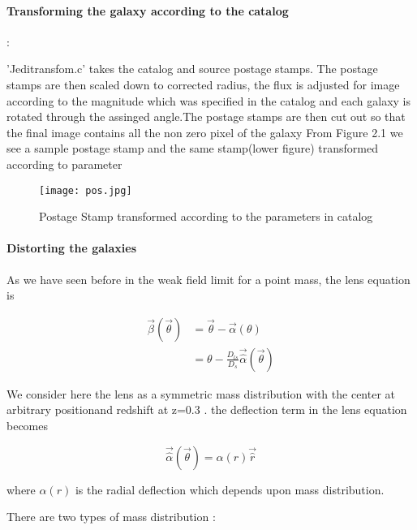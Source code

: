 \paragraph{Transforming the galaxy according to the catalog}:

'Jeditransfom.c' takes the catalog and source postage stamps. The postage stamps are then scaled down to corrected radius, the flux is adjusted for image according to
the magnitude which was specified in the catalog and each galaxy is rotated through the assinged angle.The postage stamps are then cut out so that
the final image contains all the non zero pixel of the galaxy
From Figure 2.1 we see a sample postage stamp and the same stamp(lower figure) transformed according to parameter

\begin{figure}[ht]
\begin{center}
\texttt{[image: pos.jpg]}
\label{fig}
\caption{Postage Stamp transformed according to the parameters in catalog}
\end{center}
\end{figure}

\clearpage

\paragraph{Distorting the galaxies}

As we have seen before in the weak field limit for a point mass, the lens equation is

\begin{equation}
\begin{split}
 \vec\beta(\vec\theta) &= \vec\theta - \vec\alpha(\theta) \\
                       &= \theta - \frac{D_{ls}}{D_s}  \vec\hat\alpha(\vec\theta)
\end{split}
\end{equation}

We consider here the lens as a symmetric mass distribution with the center at arbitrary positionand redshift at z=0.3 . the deflection term in the lens equation becomes

\begin{equation}
 \vec\hat\alpha(\vec\theta) = \alpha(r) {\vec\hat r}
\end{equation}

where $\alpha(r)$ is the radial deflection which depends upon mass distribution.

There are two types of mass distribution :


